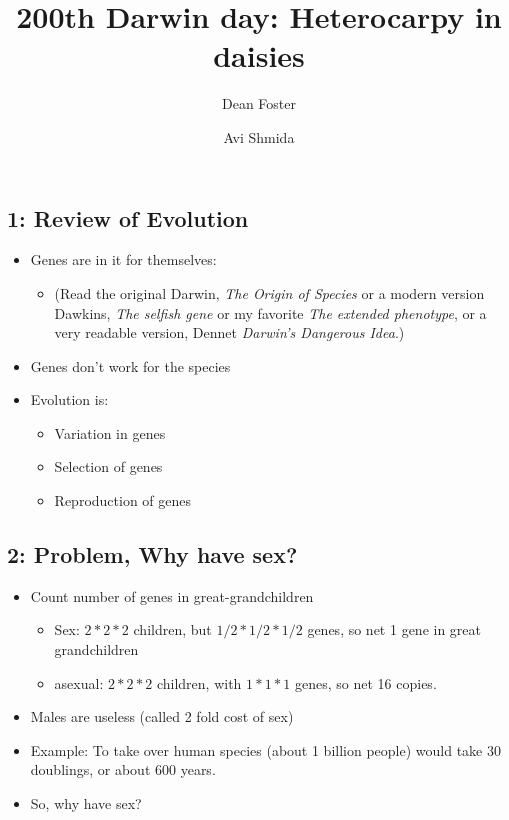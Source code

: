 \documentclass[12pt,twocolumn]{article}
\begin{document}
\pagestyle{empty}
\title{200th Darwin day: Heterocarpy in daisies}
\author{Dean Foster \and Avi Shmida}
\maketitle
\thispagestyle{empty}
\pagestyle{empty}

\subsection*{1: Review of Evolution}
\begin{itemize}
\item Genes are in it for themselves: 
\begin{itemize}
\item (Read the original Darwin, {\em
The Origin of Species} or a modern version Dawkins, {\em The selfish
gene} or my favorite {\em The extended phenotype}, or a very readable
version, Dennet {\em Darwin's Dangerous Idea}.) 
\end{itemize}
\item Genes don't work for the species
\item Evolution is:
\begin{itemize}
\item Variation in genes
\item Selection of genes
\item Reproduction of genes
\end{itemize}
\end{itemize}

\subsection*{2: Problem, Why have sex?}
\begin{itemize}
\item Count number of genes in great-grandchildren
\begin{itemize}
\item Sex: $2 * 2 * 2$ children, but $1/2 * 1/2 * 1/2$ genes, so net 1
gene in great grandchildren
\item asexual: $2 * 2 * 2$ children, with $1 * 1 * 1$ genes, so net 16
copies. 
\end{itemize}
\item Males are useless (called 2 fold cost of sex)
\item Example: To take over human species (about 1 billion people) would take
30 doublings, or about 600 years.
\item So, why have sex?
\end{itemize}
\end{document}
